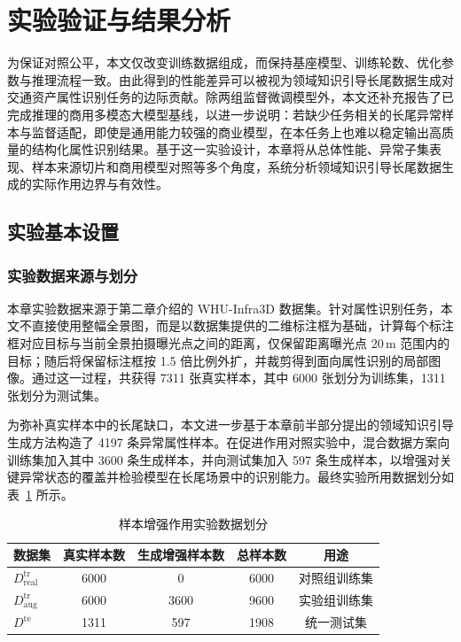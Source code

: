 \section{实验验证与结果分析}

为保证对照公平，本文仅改变训练数据组成，而保持基座模型、训练轮数、优化参数与推理流程一致。由此得到的性能差异可以被视为领域知识引导长尾数据生成对交通资产属性识别任务的边际贡献。除两组监督微调模型外，本文还补充报告了已完成推理的商用多模态大模型基线，以进一步说明：若缺少任务相关的长尾异常样本与监督适配，即使是通用能力较强的商业模型，在本任务上也难以稳定输出高质量的结构化属性识别结果。基于这一实验设计，本章将从总体性能、异常子集表现、样本来源切片和商用模型对照等多个角度，系统分析领域知识引导长尾数据生成的实际作用边界与有效性。

\subsection{实验基本设置}

\subsubsection{实验数据来源与划分}

本章实验数据来源于第二章介绍的 WHU-Infra3D 数据集\cite{whu_infra3d_2025}。针对属性识别任务，本文不直接使用整幅全景图，而是以数据集提供的二维标注框为基础，计算每个标注框对应目标与当前全景拍摄曝光点之间的距离，仅保留距离曝光点 20\,m 范围内的目标；随后将保留标注框按 1.5 倍比例外扩，并裁剪得到面向属性识别的局部图像。通过这一过程，共获得 7311 张真实样本，其中 6000 张划分为训练集，1311 张划分为测试集。

为弥补真实样本中的长尾缺口，本文进一步基于本章前半部分提出的领域知识引导生成方法构造了 4197 条异常属性样本。在促进作用对照实验中，混合数据方案向训练集加入其中 3600 条生成样本，并向测试集加入 597 条生成样本，以增强对关键异常状态的覆盖并检验模型在长尾场景中的识别能力。最终实验所用数据划分如表~\ref{tab:kg_dataset_split} 所示。

\begin{table}[htbp]
\centering
\caption{样本增强作用实验数据划分}
\label{tab:kg_dataset_split}
\begin{tabular}{lcccc}
\toprule
\textbf{数据集} & \textbf{真实样本数} & \textbf{生成增强样本数} & \textbf{总样本数} & \textbf{用途}\\
\midrule
$D_{\mathrm{real}}^{\mathrm{tr}}$ & 6000 & 0 & 6000 & 对照组训练集\\
$D_{\mathrm{aug}}^{\mathrm{tr}}$ & 6000 & 3600 & 9600 & 实验组训练集\\
$D^{\mathrm{te}}$ & 1311 & 597 & 1908 & 统一测试集\\
\bottomrule
\end{tabular}
\end{table}

